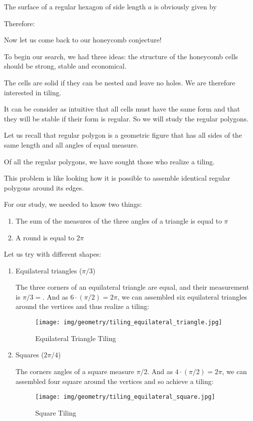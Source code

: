{	The surface of a regular hexagon of side length $a$ is obviously given by
	
	Therefore:
	
	
	Now let us come back to our honeycomb conjecture!
	
	To begin our search, we had three ideas: the structure of the honeycomb cells should be strong, stable and economical.
	
	The cells are solid if they can be nested and leave no holes. We are therefore interested in tiling.
	
	It can be consider as intuitive that all cells must have the same form and that they will be stable if their form is regular. So we will study the regular polygons.
	
	Let us recall that regular polygon is a geometric figure that has all sides of the same length and all angles of equal measure.
	
	Of all the regular polygons, we have sought those who realize a tiling.
	
	This problem is like looking how it is possible to assemble identical regular polygons around its edges.
	
	For our study, we needed to know two things:
	\begin{enumerate}
		\item The sum of the measures of the three angles of a triangle is equal to $\pi$

		\item A round is equal to $2\pi$
	\end{enumerate}
	Let us try with different shapes:
	\begin{enumerate}
		\item Equilateral triangles ($\pi/3$)

		The three corners of an equilateral triangle are equal, and their measurement is $\pi/3=$. And as $6\cdot (\pi/2) = 2\pi$, we can assembled six equilateral triangles around the vertices and thus realize a tiling:
		\begin{figure}[H]
			\centering
			\texttt{[image: img/geometry/tiling\_equilateral\_triangle.jpg]}
			\caption[]{Equilateral Triangle Tiling}
		\end{figure}
		
		\item Squares ($2\pi/4$)

		The corners angles of a square measure $\pi/2$. And as $4\cdot (\pi/2)=2\pi$, we can assembled four square around the vertices and so achieve a tiling:
		\begin{figure}[H]
			\centering
			\texttt{[image: img/geometry/tiling\_equilateral\_square.jpg]}
			\caption[]{Square Tiling}
		\end{figure}
		

\end{enumerate}}
